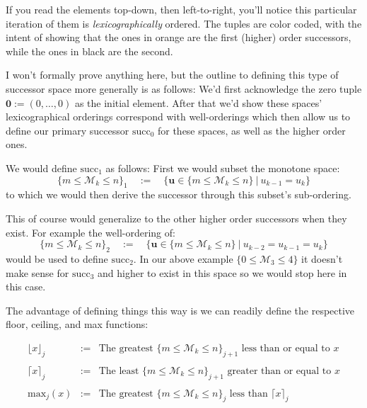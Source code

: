 \documentclass[twoside]{article}
\begin{document}
If you read the elements top-down, then left-to-right, you'll notice this particular iteration of them is
\emph{lexicographically} ordered. The tuples are color coded, with the intent of showing that the ones in
orange are the first (higher) order successors, while the ones in black are the second.

I won't formally prove anything here, but the outline to defining this type of successor space more generally is
as follows: We'd first acknowledge the zero tuple $ {\mathbf 0}:=(0,\ldots,0) $ as the initial element. After that
we'd show these spaces' lexicographical orderings correspond with well-orderings which then allow us to define our
primary successor $ \mbox{succ}_0 $ for these spaces, as well as the higher order ones.

We would define $ \mbox{succ}_1 $ as follows: First we would subset the monotone space:
$$ \{m\le\mathcal{M}_k\le n\}_1\quad:=\quad\{ {\mathbf u}\in\{m\le\mathcal{M}_k\le n\}\ |\ u_{k-1} = u_k \}  $$
to which we would then derive the successor through this subset's sub-ordering.

This of course would generalize to the other higher order successors when they exist. For example the well-ordering of:
$$ \{m\le\mathcal{M}_k\le n\}_2\quad:=\quad\{ {\mathbf u}\in\{m\le\mathcal{M}_k\le n\}\ |\ u_{k-2} = u_{k-1} = u_k \}  $$
would be used to define $ \mbox{succ}_2 $. In our above example $ \{0\le\mathcal{M}_3\le 4\} $ it doesn't make sense
for $ \mbox{succ}_3 $ and higher to exist in this space so we would stop here in this case.

The advantage of defining things this way is we can readily define the respective floor, ceiling, and max functions:

$$ \begin{array}{rcl}
\lfloor x\rfloor_j	& := & \mbox{The greatest }\{m\le\mathcal{M}_k\le n\}_{j+1}\mbox{ less than or equal to } x		\\
																\\
\lceil x\rceil_j	& := & \mbox{The least }\{m\le\mathcal{M}_k\le n\}_{j+1}\mbox{ greater than or equal to } x		\\
																\\
\mbox{max}_j(x)		& := & \mbox{The greatest }\{m\le\mathcal{M}_k\le n\}_j\mbox{ less than } \lceil x\rceil_j		\\
																\\
\end{array} $$

\newpage
\end{document}
